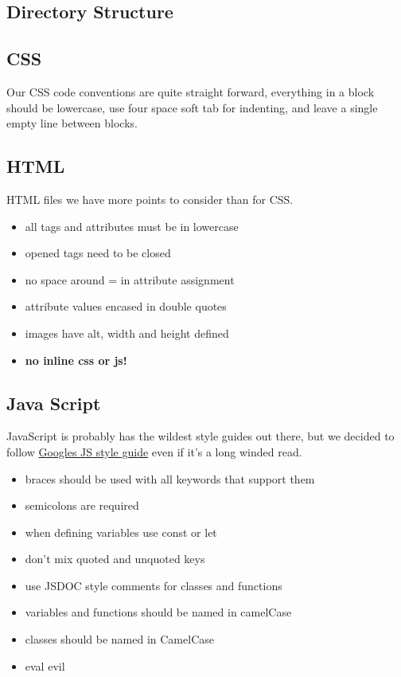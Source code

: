 \subsection{Directory Structure}


\subsection{CSS}
Our CSS code conventions are quite straight forward, everything in a block should be lowercase, use four space soft tab for indenting, and leave a single empty line between blocks.

\subsection{HTML}
HTML files we have more points to consider than for CSS.

\begin{itemize}
	\item all tags and attributes must be in lowercase
	\item opened tags need to be closed
	\item no space around = in attribute assignment
	\item attribute values encased in double quotes
	\item images have alt, width and height defined
	\item \textbf{no inline css or js!}
\end{itemize}

\subsection{Java Script}
JavaScript is probably has the wildest style guides out there, but we decided to follow \href{https://google.github.io/styleguide/jsguide.html}{Googles JS style guide} even if it's a long winded read.

\begin{itemize}
	\item braces should be used with all keywords that support them
	\item semicolons are required
	\item when defining variables use const or let
	\item don't mix quoted and unquoted keys
	\item use JSDOC style comments for classes and functions
	\item variables and functions should be named in camelCase
	\item classes should be named in CamelCase
	\item eval evil
\end{itemize}

